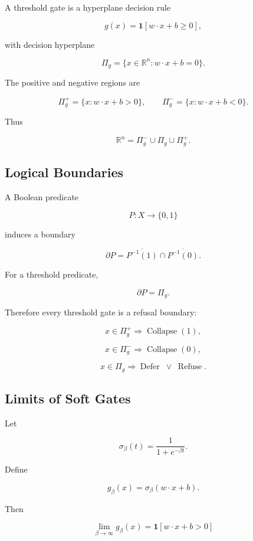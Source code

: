 \documentclass[12pt,oneside]{article}
\theoremstyle{definition}
\theoremstyle{remark}
\begin{document}
A threshold gate is a hyperplane decision rule

\[
g(x)
=
\mathbf 1
\left[
w\cdot x+b\ge 0
\right],
\]

with decision hyperplane

\[
\Pi_g
=
\{
x\in\mathbb R^n
:
w\cdot x+b=0
\}.
\]

The positive and negative regions are

\[
\Pi_g^+
=
\{
x:w\cdot x+b>0
\},
\qquad
\Pi_g^-
=
\{
x:w\cdot x+b<0
\}.
\]

Thus

\[
\mathbb R^n
=
\Pi_g^-
\cup
\Pi_g
\cup
\Pi_g^+.
\]

\subsection*{Logical Boundaries}

A Boolean predicate

\[
P:X\rightarrow\{0,1\}
\]

induces a boundary

\[
\partial P
=
\overline{P^{-1}(1)}
\cap
\overline{P^{-1}(0)}.
\]

For a threshold predicate,

\[
\partial P
=
\Pi_g.
\]

Therefore every threshold gate is a refusal boundary:

\[
x\in\Pi_g^+
\Longrightarrow
\operatorname{Collapse}(1),
\]

\[
x\in\Pi_g^-
\Longrightarrow
\operatorname{Collapse}(0),
\]

\[
x\in\Pi_g
\Longrightarrow
\operatorname{Defer}
\;\vee\;
\operatorname{Refuse}.
\]

\subsection*{Limits of Soft Gates}

Let

\[
\sigma_\beta(t)
=
\frac{1}{1+e^{-\beta t}}.
\]

Define

\[
g_\beta(x)
=
\sigma_\beta(w\cdot x+b).
\]

Then

\[
\lim_{\beta\rightarrow\infty}
g_\beta(x)
=
\mathbf 1[w\cdot x+b>0]
\]
\end{document}
